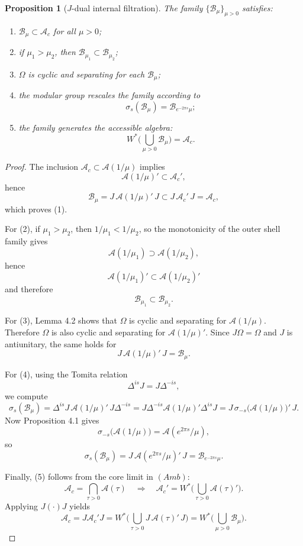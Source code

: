 \documentclass[12pt]{article}
\newtheorem{proposition}[theorem]{Proposition}
\theoremstyle{definition}
\theoremstyle{remark}
\newcommand{\tightlist}{%
  \setlength{\itemsep}{0pt}\setlength{\parskip}{0pt}}
\begin{document}
\begin{proposition}[\(J\)-dual internal filtration]\label{prop:4.3}
The family \(\{\mathcal{B}_\mu\}_{\mu>0}\) satisfies:

\begin{enumerate}
\def\labelenumi{\arabic{enumi}.}
\tightlist
\item
  \(\mathcal{B}_\mu\subset \mathcal{A}_c\) for all \(\mu>0\);
\item
  if \(\mu_1>\mu_2\), then
  \(\mathcal{B}_{\mu_1}\subset \mathcal{B}_{\mu_2}\);
\item
  \(\Omega\) is cyclic and separating for each \(\mathcal{B}_\mu\);
\item
  the modular group rescales the family according to \[
  \sigma_s(\mathcal{B}_\mu)=\mathcal{B}_{e^{-2\pi s}\mu};
  \]
\item
  the family generates the accessible algebra: \[
  W^*\!\Big(\bigcup_{\mu>0}\mathcal{B}_\mu\Big)=\mathcal{A}_c.
  \]
\end{enumerate}
\end{proposition}

\begin{proof}
The inclusion \(\mathcal{A}_c\subset \mathcal{A}(1/\mu)\) implies \[
\mathcal{A}(1/\mu)'\subset \mathcal{A}_c',
\] hence \[
\mathcal{B}_\mu
=
J\,\mathcal{A}(1/\mu)'\,J
\subset
J\,\mathcal{A}_c'\,J
=
\mathcal{A}_c,
\] which proves (1).

For (2), if \(\mu_1>\mu_2\), then \(1/\mu_1<1/\mu_2\), so the
monotonicity of the outer shell family gives \[
\mathcal{A}(1/\mu_1)\supset \mathcal{A}(1/\mu_2),
\] hence \[
\mathcal{A}(1/\mu_1)'\subset \mathcal{A}(1/\mu_2)'
\] and therefore \[
\mathcal{B}_{\mu_1}\subset \mathcal{B}_{\mu_2}.
\]

For (3), Lemma 4.2 shows that \(\Omega\) is cyclic and separating for
\(\mathcal{A}(1/\mu)\). Therefore \(\Omega\) is also cyclic and
separating for \(\mathcal{A}(1/\mu)'\). Since \(J\Omega=\Omega\) and
\(J\) is antiunitary, the same holds for \[
J\,\mathcal{A}(1/\mu)'\,J=\mathcal{B}_\mu.
\]

For (4), using the Tomita relation \[
\Delta^{is}J=J\Delta^{-is},
\] we compute \[
\sigma_s(\mathcal{B}_\mu)
=
\Delta^{is}J\,\mathcal{A}(1/\mu)'\,J\Delta^{-is}
=
J\Delta^{-is}\mathcal{A}(1/\mu)'\Delta^{is}J
=
J\,\sigma_{-s}\!\big(\mathcal{A}(1/\mu)\big)'\,J.
\] Now Proposition 4.1 gives \[
\sigma_{-s}\!\big(\mathcal{A}(1/\mu)\big)
=
\mathcal{A}(e^{2\pi s}/\mu),
\] so \[
\sigma_s(\mathcal{B}_\mu)
=
J\,\mathcal{A}(e^{2\pi s}/\mu)'\,J
=
\mathcal{B}_{e^{-2\pi s}\mu}.
\]

Finally, (5) follows from the core limit in \((Amb)\): \[
\mathcal{A}_c=\bigcap_{\tau>0}\mathcal{A}(\tau)
\quad\Longrightarrow\quad
\mathcal{A}_c'=W^*\!\Big(\bigcup_{\tau>0}\mathcal{A}(\tau)'\Big).
\] Applying \(J(\cdot)J\) yields \[
\mathcal{A}_c
=
J\mathcal{A}_c'J
=
W^*\!\Big(\bigcup_{\tau>0}J\,\mathcal{A}(\tau)'\,J\Big)
=
W^*\!\Big(\bigcup_{\mu>0}\mathcal{B}_\mu\Big).
\]
\end{proof}
\end{document}
